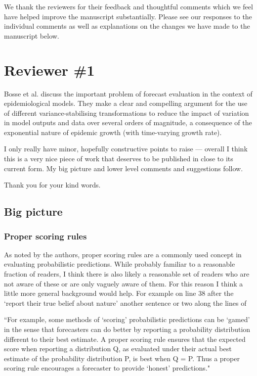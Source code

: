 \documentclass{article}
\newcommand{\red}{\color{red}}
\newcommand{\black}{\color{black}}
\newcommand{\blue}{\color{blue}}
\begin{document}


\black
We thank the reviewers for their feedback and thoughtful comments which we feel have helped improve the manuscript substantially. Please see our responses to the individual comments as well as explanations on the changes we have made to the manuscript below. 


\section{Reviewer \#1}

\blue
Bosse et al. discuss the important problem of forecast evaluation in the context of epidemiological models. They make a clear and compelling argument for the use of different variance-stabilising transformations to reduce the impact of variation in model outputs and data over several orders of magnitude, a consequence of the exponential nature of epidemic growth (with time-varying growth rate).

I only really have minor, hopefully constructive points to raise — overall I think this is a very nice piece of work that deserves to be published in close to its current form. My big picture and lower level comments and suggestions follow.

\black
Thank you for your kind words.

\blue
\subsection{Big picture}
\subsubsection{Proper scoring rules}
As noted by the authors, proper scoring rules are a commonly used concept in evaluating probabilistic predictions. While probably familiar to a reasonable fraction of readers, I think there is also likely a reasonable set of readers who are not aware of these or are only vaguely aware of them. For this reason I think a little more general background would help. For example on line 38 after the ‘report their true belief about nature’ another sentence or two along the lines of

“For example, some methods of ‘scoring’ probabilistic predictions can be ‘gamed’ in the sense that forecasters can do better by reporting a probability distribution different to their best estimate. A proper scoring rule ensures that the expected score when reporting a distribution Q, as evaluated under their actual best estimate of the probability distribution P, is best when Q = P. Thus a proper scoring rule encourages a forecaster to provide ‘honest’ predictions."
\end{document}
